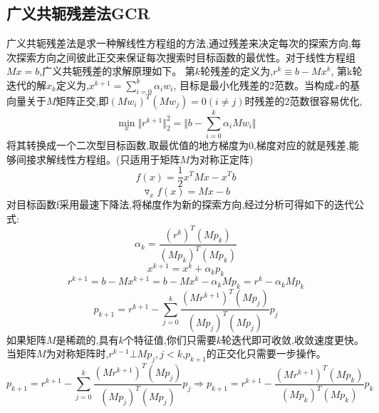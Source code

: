\documentclass[12pt]{article}
\begin{document}
\begin{sloppypar}
\subsection{广义共轭残差法GCR}
\qquad 广义共轭残差法是求一种解线性方程组的方法,通过残差来决定每次的探索方向,每次探索方向之间彼此正交来保证每次搜索时目标函数的最优性。对于线性方程组$Mx=b$,广义共轭残差的求解原理如下。
\qquad 第$k$轮残差的定义为,$ r^k \equiv b - Mx^k$, 第k轮迭代的解$x_k$定义为,$x^{k+1} = \sum_{i=0}^{k} \alpha_i w_i$, 目标是最小化残差的2范数。当构成$x$的基向量关于$M$矩阵正交,即$(Mw_i)^T(Mw_j)=0 (i \neq j)$时残差的2范数很容易优化,
\begin{equation}
  \mathop{\min}_{x} \Vert r^{k+1} \Vert_2^2 = \Vert b - \sum_{i=0}^{k} \alpha_i M w_i \Vert
\end{equation}
\qquad 将其转换成一个二次型目标函数,取最优值的地方梯度为0,梯度对应的就是残差,能够间接求解线性方程组。(只适用于矩阵$M$为对称正定阵)
\begin{equation}
  f(x) = \frac{1}{2}x^TMx-x^Tb
\end{equation}
\begin{equation}
  \triangledown_xf(x) = Mx-b
\end{equation}
\qquad 对目标函数f采用最速下降法,将梯度作为新的探索方向,经过分析可得如下的迭代公式:
\begin{equation}  
  \alpha_k= \frac{\left(r^k\right)^T\left(M p_k\right)}{\left(M p_k\right)^T\left(M p_k\right)} 
\end{equation}
\begin{equation}
  x^{k+1} =x^k+\alpha_k p_k
\end{equation}
\begin{equation}
  r^{k+1} =b-M x^{k+1} =b-M x^k-\alpha_k M p_k =r^k-\alpha_k M p_k
\end{equation}
\begin{equation}
  p_{k+1} =r^{k+1}-\sum_{j=0}^k \frac{\left(M r^{k+1}\right)^T\left(M p_j\right)}{\left(M p_j\right)^T\left(M p_j\right)} p_j
\end{equation}
\qquad 如果矩阵$M$是稀疏的,具有$k$个特征值,你们只需要$k$轮迭代即可收敛,收敛速度更快。当矩阵$M$为对称矩阵时,$r^{k-1} \bot Mp_j,j<k$,$p_{k+1}$的正交化只需要一步操作。
\begin{equation}
  p_{k+1}=r^{k+1}-\sum_{j=0}^k \frac{\left(M r^{k+1}\right)^T\left(M p_j\right)}{\left(M p_j\right)^T\left(M p_j\right)} p_j \Rightarrow p_{k+1}=r^{k+1}-\frac{\left(M r^{k+1}\right)^T\left(M p_k\right)}{\left(M p_k\right)^T\left(M p_k\right)} p_k
\end{equation}


\end{sloppypar}
\end{document}
